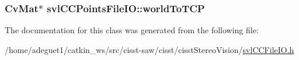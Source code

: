 \hypertarget{classsvl_c_c_points_file_i_o_a8fae958b1268f3d9d0719f8187043f2d}{
\subsubsection[{world\-To\-T\-C\-P}]{\setlength{\rightskip}{0pt plus 5cm}Cv\-Mat$\ast$ svl\-C\-C\-Points\-File\-I\-O\-::world\-To\-T\-C\-P}}\label{classsvl_c_c_points_file_i_o_a8fae958b1268f3d9d0719f8187043f2d}


The documentation for this class was generated from the following file\-:\begin{DoxyCompactItemize}
\item 
/home/adeguet1/catkin\-\_\-ws/src/cisst-\/saw/cisst/cisst\-Stereo\-Vision/\hyperlink{svl_c_c_file_i_o_8h}{svl\-C\-C\-File\-I\-O.\-h}\end{DoxyCompactItemize}
